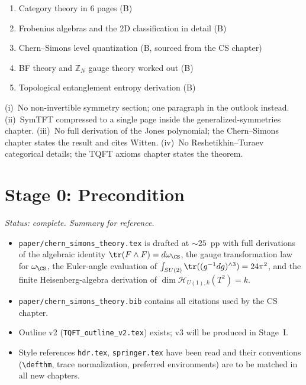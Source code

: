 \documentclass[11pt]{article}
\begin{document}
\begin{enumerate}[label=\Alph*.,leftmargin=2em]
\item Category theory in 6 pages (B)
\item Frobenius algebras and the 2D classification in detail (B)
\item Chern--Simons level quantization (B, sourced from the CS chapter)
\item BF theory and $\mathbb{Z}_N$ gauge theory worked out (B)
\item Topological entanglement entropy derivation (B)
\end{enumerate}

\begin{insight}
(i)~No non-invertible symmetry section; one paragraph in the outlook instead.
(ii)~SymTFT compressed to a single page inside the generalized-symmetries chapter.
(iii)~No full derivation of the Jones polynomial; the Chern--Simons chapter states the
result and cites Witten.
(iv)~No Reshetikhin--Turaev categorical details; the TQFT axioms chapter states the theorem.
\end{insight}

\section{Stage 0: Precondition}\label{sec:stage0}

\noindent\textit{Status: complete. Summary for reference.}

\begin{itemize}
\item \texttt{paper/chern\_simons\_theory.tex} is drafted at $\sim 25$~pp with full
derivations of the algebraic identity $\tr(F\wedge F)=d\omega_{\CS}$, the gauge transformation
law for $\omega_{\CS}$, the Euler-angle evaluation of $\int_{SU(2)}\tr((g^{-1}dg)^{\wedge 3})=24\pi^2$,
and the finite Heisenberg-algebra derivation of $\dim\mathcal{H}_{U(1),k}(T^2)=k$.
\item \texttt{paper/chern\_simons\_theory.bib} contains all citations used by the CS chapter.
\item Outline v2 (\texttt{TQFT\_outline\_v2.tex}) exists; v3 will be produced in Stage~I.
\item Style references \texttt{hdr.tex}, \texttt{springer.tex} have been read and their
conventions (\texttt{\textbackslash defthm}, trace normalization, preferred environments)
are to be matched in all new chapters.
\end{itemize}
\end{document}
